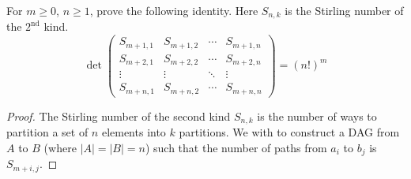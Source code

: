 \documentclass[letterpaper]{article}
\begin{document}
\begin{quest}[\textcolor{red}{Determinant of a matrix of Stirling Numbers}]
    For $m\geq0$, $n\geq 1$, prove the following identity. Here $S_{n,k}$ is the Stirling number of the $2^{\text{nd}}$ kind.
    \[\det\begin{pmatrix}S_{m+1,1}&S_{m+1,2}&\cdots&S_{m+1,n}\\S_{m+2,1}&S_{m+2,2}&\cdots&S_{m+2,n}\\\vdots&\vdots&\ddots&\vdots\\S_{m+n,1}&S_{m+n,2}&\cdots&S_{m+n,n}\end{pmatrix}=(n!)^m\]
\end{quest}
\begin{proof}
    The Stirling number of the second kind $S_{n,k}$ is the number of ways to partition a set of $n$ elements into $k$ partitions. We with to construct a DAG from $A$ to $B$ (where $|A|=|B|=n$) such that the number of paths from $a_i$ to $b_j$ is $S_{m+i,j}$.
\end{proof}
\end{document}
